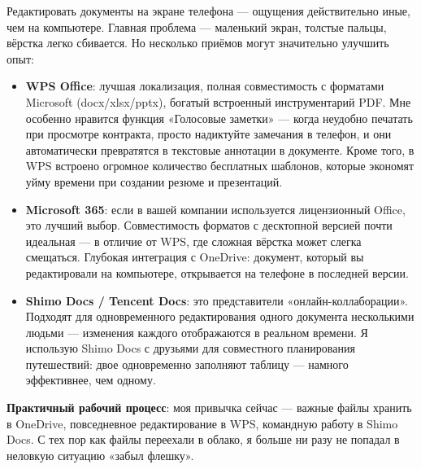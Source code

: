 


Редактировать документы на экране телефона — ощущения действительно иные, чем на компьютере. Главная проблема — маленький экран, толстые пальцы, вёрстка легко сбивается. Но несколько приёмов могут значительно улучшить опыт:

\begin{itemize}
  \item \textbf{WPS Office}: лучшая локализация, полная совместимость с форматами Microsoft (docx/xlsx/pptx), богатый встроенный инструментарий PDF. Мне особенно нравится функция «Голосовые заметки» — когда неудобно печатать при просмотре контракта, просто надиктуйте замечания в телефон, и они автоматически превратятся в текстовые аннотации в документе. Кроме того, в WPS встроено огромное количество бесплатных шаблонов, которые экономят уйму времени при создании резюме и презентаций.
  \item \textbf{Microsoft 365}: если в вашей компании используется лицензионный Office, это лучший выбор. Совместимость форматов с десктопной версией почти идеальная — в отличие от WPS, где сложная вёрстка может слегка смещаться. Глубокая интеграция с OneDrive: документ, который вы редактировали на компьютере, открывается на телефоне в последней версии.
  \item \textbf{Shimo Docs / Tencent Docs}: это представители «онлайн-коллаборации». Подходят для одновременного редактирования одного документа несколькими людьми — изменения каждого отображаются в реальном времени. Я использую Shimo Docs с друзьями для совместного планирования путешествий: двое одновременно заполняют таблицу — намного эффективнее, чем одному.
\end{itemize}

\textbf{Практичный рабочий процесс}: моя привычка сейчас — важные файлы хранить в OneDrive, повседневное редактирование в WPS, командную работу в Shimo Docs. С тех пор как файлы переехали в облако, я больше ни разу не попадал в неловкую ситуацию «забыл флешку».

